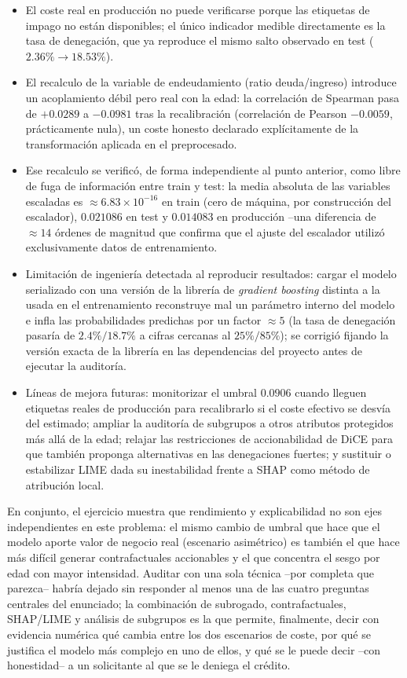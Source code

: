 \documentclass[11pt,a4paper]{article}
\begin{document}
\begin{itemize}
\item El coste real en producci\'on no puede verificarse porque las etiquetas de impago no est\'an
disponibles; el \'unico indicador medible directamente es la tasa de denegaci\'on, que ya reproduce el
mismo salto observado en test ($2.36\% \rightarrow 18.53\%$).
\item El recalculo de la variable de endeudamiento (ratio deuda/ingreso) introduce un acoplamiento d\'ebil
pero real con la edad: la correlaci\'on de Spearman pasa de $+0.0289$ a $-0.0981$ tras la recalibraci\'on
(correlaci\'on de Pearson $-0.0059$, pr\'acticamente nula), un coste honesto declarado expl\'icitamente de
la transformaci\'on aplicada en el preprocesado.
\item Ese recalculo se verific\'o, de forma independiente al punto anterior, como libre de fuga de
informaci\'on entre train y test: la media absoluta de las variables escaladas es $\approx 6.83\times
10^{-16}$ en train (cero de m\'aquina, por construcci\'on del escalador), $0.021086$ en test y $0.014083$
en producci\'on --una diferencia de $\approx 14$ \'ordenes de magnitud que confirma que el ajuste del
escalador utiliz\'o exclusivamente datos de entrenamiento.
\item Limitaci\'on de ingenier\'ia detectada al reproducir resultados: cargar el modelo serializado con una
versi\'on de la librer\'ia de \emph{gradient boosting} distinta a la usada en el entrenamiento reconstruye
mal un par\'ametro interno del modelo e infla las probabilidades predichas por un factor $\approx 5$ (la
tasa de denegaci\'on pasar\'ia de $2.4\%/18.7\%$ a cifras cercanas al $25\%/85\%$); se corrigi\'o fijando la
versi\'on exacta de la librer\'ia en las dependencias del proyecto antes de ejecutar la auditor\'ia.
\item L\'ineas de mejora futuras: monitorizar el umbral $0.0906$ cuando lleguen etiquetas reales de
producci\'on para recalibrarlo si el coste efectivo se desv\'ia del estimado; ampliar la auditor\'ia de
subgrupos a otros atributos protegidos m\'as all\'a de la edad; relajar las restricciones de accionabilidad
de DiCE para que tambi\'en proponga alternativas en las denegaciones fuertes; y sustituir o estabilizar
LIME dada su inestabilidad frente a SHAP como m\'etodo de atribuci\'on local.
\end{itemize}

En conjunto, el ejercicio muestra que rendimiento y explicabilidad no son ejes independientes en este
problema: el mismo cambio de umbral que hace que el modelo aporte valor de negocio real (escenario
asim\'etrico) es tambi\'en el que hace m\'as dif\'icil generar contrafactuales accionables y el que
concentra el sesgo por edad con mayor intensidad. Auditar con una sola t\'ecnica --por completa que
parezca-- habr\'ia dejado sin responder al menos una de las cuatro preguntas centrales del enunciado; la
combinaci\'on de subrogado, contrafactuales, SHAP/LIME y an\'alisis de subgrupos es la que permite,
finalmente, decir con evidencia num\'erica qu\'e cambia entre los dos escenarios de coste, por qu\'e se
justifica el modelo m\'as complejo en uno de ellos, y qu\'e se le puede decir --con honestidad-- a un
solicitante al que se le deniega el cr\'edito.
\end{document}
